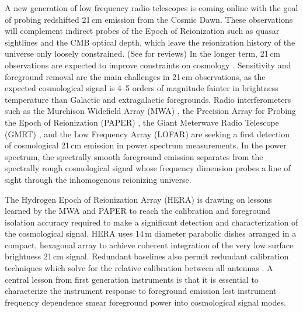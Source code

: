 \documentclass{emulateapj}
\begin{document}
A new generation of low frequency radio telescopes is coming online with the goal of
 probing redshifted 21\,cm emission from the Cosmic Dawn. These observations will 
 complement indirect probes of the Epoch of Reionization such as quasar 
 sightlines and the CMB optical depth, which leave the reionization 
 history of the universe only loosely constrained. (See \citet{FurlanettoReview, miguelreview, PritchardLoebReview, aviBook, zaroubi} for reviews) In the longer term, 21\,cm observations are expected to improve constraints on cosmology \citep[e.g.,][]{mao08, liu15a,liu15b}. Sensitivity and foreground removal are 
 the main challenges in 21\,cm observations, as the expected cosmological signal is 4--5 
 orders of magnitude fainter in brightness temperature than Galactic and extragalactic foregrounds. Radio 
 interferometers such as the Murchison Widefield Array (MWA) \citep{lonsdale09,tingay13,mwascience}, the Precision Array for Probing the Epoch of Reionization (PAPER) \citep{parsons10,parsons14,ali2015}, the Giant Meterwave Radio Telescope (GMRT) 
 \citep{Paciga2011}, and the Low Frequency Array (LOFAR) \citep{lofar} are seeking a first detection of 
 cosmological 21\,cm emission in power spectrum measurements. In the power spectrum, the spectrally smooth foreground emission separates from the spectrally 
 rough cosmological signal whose frequency dimension probes a line of sight through the 
 inhomogenous reionizing universe.


The Hydrogen Epoch of Reionization Array (HERA) \citep{PoberNextGen,deboer16} is drawing on lessons learned by the MWA and PAPER to reach the calibration and foreground isolation accuracy required to make a significant detection and characterization of the cosmological signal. HERA uses 14\,m diameter parabolic dishes arranged in a compact, hexagonal array to achieve coherent integration of the very low surface brightness 21\,cm signal. Redundant baselines also permit redundant calibration techniques which solve for the relative calibration between all antennas \citep{redundant3, redundant4, liu2010,zheng14}. A central lesson from first generation instruments is that it is essential to characterize the instrument response to foreground emission lest instrument frequency dependence smear foreground power into cosmological signal modes. 

\end{document}
